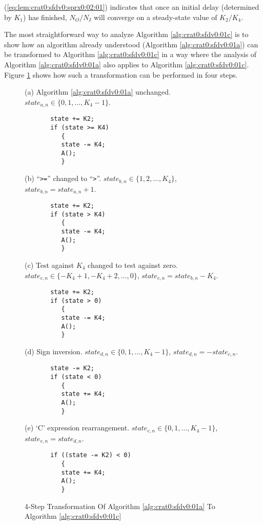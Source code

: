 \begin{vworklemmaproof}
(\ref{eq:lem:crat0:sfdv0:sprx0:02:01}) indicates that once
an initial delay (determined by $K_1$) has finished, 
$N_O/N_I$ will converge on a steady-state value of
$K_2/K_4$.

The most straightforward way to analyze Algorithm \ref{alg:crat0:sfdv0:01c} 
is to show how an algorithm already
understood (Algorithm \ref{alg:crat0:sfdv0:01a}) 
can be transformed to 
Algorithm \ref{alg:crat0:sfdv0:01c} 
in a way where the analysis of Algorithm \ref{alg:crat0:sfdv0:01a}
also applies to Algorithm \ref{alg:crat0:sfdv0:01c}.  
Figure \ref{fig:lem:crat0:sfdv0:sprx0:02:01} shows
how such a transformation can be performed in 
four steps.

\begin{figure}
(a) Algorithm \ref{alg:crat0:sfdv0:01a} unchanged.  
$state_{a,n} \in \{0, 1, \ldots, K_4 - 1 \}$.
\begin{verbatim}
       state += K2;
       if (state >= K4)
          {
          state -= K4;
          A();
          }
\end{verbatim}
(b) ``\texttt{>=}'' changed to ``\texttt{>}''.  $state_{b,n} \in \{1, 2, \ldots, K_4 \}$,
    $state_{b,n} = state_{a,n} + 1$.
\begin{verbatim}
       state += K2;
       if (state > K4)
          {
          state -= K4;
          A();
          }
\end{verbatim}
(c) Test against $K_4$ changed to test against zero.  
    $state_{c,n} \in \{-K_4 + 1, -K_4 + 2, \ldots, 0 \}$,
    $state_{c,n} = state_{b,n} - K_4$.
\begin{verbatim}
       state += K2;
       if (state > 0)
          {
          state -= K4;
          A();
          }
\end{verbatim}
(d) Sign inversion.  
    $state_{d,n} \in \{ 0, 1, \ldots, K_4 - 1 \}$,
    $state_{d,n} = - state_{c,n}$.
\begin{verbatim}
       state -= K2;
       if (state < 0)
          {
          state += K4;
          A();
          }
\end{verbatim}
(e) `C' expression rearrangement.  
    $state_{e,n} \in \{ 0, 1, \ldots, K_4 - 1 \}$,
    $state_{e,n} =  state_{d,n}$.
\begin{verbatim}
       if ((state -= K2) < 0)
          {
          state += K4;
          A();
          }
\end{verbatim}
\caption{4-Step Transformation Of Algorithm \ref{alg:crat0:sfdv0:01a} 
         To Algorithm \ref{alg:crat0:sfdv0:01c}}
\label{fig:lem:crat0:sfdv0:sprx0:02:01}
\end{figure}


\end{vworklemmaproof}
